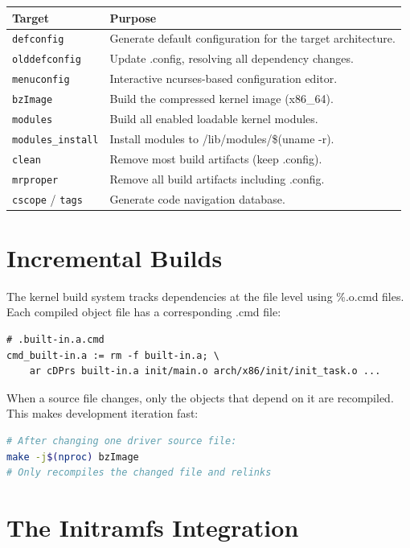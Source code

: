 \begin{longtable}{|p{3cm}|p{10cm}|}
\hline
\textbf{Target} & \textbf{Purpose} \\
\hline
\texttt{defconfig} & Generate default configuration for the target architecture. \\
\texttt{olddefconfig} & Update .config, resolving all dependency changes. \\
\texttt{menuconfig} & Interactive ncurses-based configuration editor. \\
\texttt{bzImage} & Build the compressed kernel image (x86\_64). \\
\texttt{modules} & Build all enabled loadable kernel modules. \\
\texttt{modules\_install} & Install modules to /lib/modules/\$(uname -r). \\
\texttt{clean} & Remove most build artifacts (keep .config). \\
\texttt{mrproper} & Remove all build artifacts including .config. \\
\texttt{cscope} / \texttt{tags} & Generate code navigation database. \\
\hline
\end{longtable}

\section{Incremental Builds}

The kernel build system tracks dependencies at the file level using
\%.o.cmd files. Each compiled object file has a corresponding .cmd file:

\begin{lstlisting}
# .built-in.a.cmd
cmd_built-in.a := rm -f built-in.a; \
    ar cDPrs built-in.a init/main.o arch/x86/init/init_task.o ...
\end{lstlisting}

When a source file changes, only the objects that depend on it are
recompiled. This makes development iteration fast:
\begin{lstlisting}[language=bash]
# After changing one driver source file:
make -j$(nproc) bzImage
# Only recompiles the changed file and relinks
\end{lstlisting}

\section{The Initramfs Integration}

